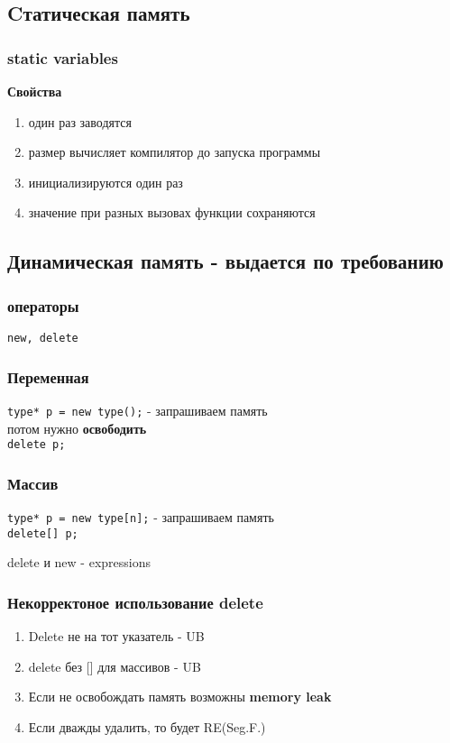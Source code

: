 \documentclass[12pt, a5paper]{article}
\begin{document}
\subsection{Cтатическая память}
\subsubsection{static variables}
\textbf{Свойства}
\begin{enumerate}
\item один раз заводятся
\item размер вычисляет компилятор до запуска программы
\item инициализируются один раз
\item значение при разных вызовах функции сохраняются
\end{enumerate}


\subsection{Динамическая память - выдается по требованию}
\subsubsection{операторы}
\texttt{new, delete}
\subsubsection{Переменная}
\texttt{type* p = new type();} - запрашиваем память
\\
потом нужно \textbf{освободить}
\\
\texttt{delete p;}

\subsubsection{Массив}
\texttt{type* p = new type[n];} - запрашиваем память
\\
\texttt{delete[] p;}

\begin{center}
delete и new - expressions
\end{center}

\subsubsection{Некорректоное использование delete}
\begin{enumerate}
\item Delete не на тот указатель - UB
\item delete без [] для массивов - UB
\item Если не освобождать память возможны \textbf{memory leak}
\item Если дважды удалить, то будет RE(Seg.F.)
\end{enumerate}
\end{document}
